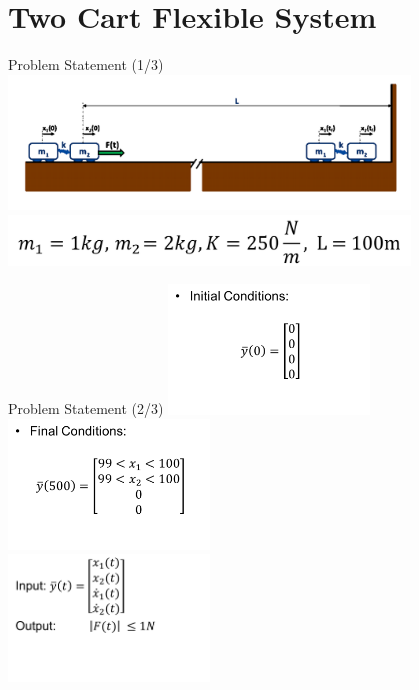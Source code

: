 \documentclass[]{beamer}
\begin{document}
\section{Two Cart Flexible System}
\begin{frame}{Problem Statement (1/3)}
    \centering
    \includegraphics[width=0.8\textwidth]{media/image7}\\
    \includegraphics[width=0.8\textwidth]{media/image8}
\end{frame}

\begin{frame}{Problem Statement (2/3)}
    \centering
    \includegraphics[width=0.4\textwidth]{media/image9}
    \includegraphics[width=0.4\textwidth]{media/image10}\\
    \includegraphics[width=0.4\textwidth]{media/image11}
\end{frame}
\end{document}
